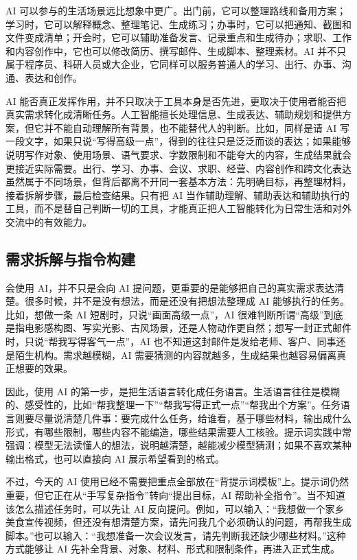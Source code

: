 AI 可以参与的生活场景远比想象中更广。出门前，它可以整理路线和备用方案；学习时，它可以解释概念、整理笔记、生成练习；办事时，它可以把通知、截图和文件变成清单；开会时，它可以辅助准备发言、记录重点和生成待办；求职、工作和内容创作中，它也可以修改简历、撰写邮件、生成脚本、整理素材。AI 并不只属于程序员、科研人员或大企业，它同样可以服务普通人的学习、出行、办事、沟通、表达和创作。

AI 能否真正发挥作用，并不只取决于工具本身是否先进，更取决于使用者能否把真实需求转化成清晰任务。人工智能擅长处理信息、生成表达、辅助规划和提供方案，但它并不能自动理解所有背景，也不能替代人的判断。比如，同样是请 AI 写一段文字，如果只说“写得高级一点”，得到的往往只是泛泛而谈的表达；如果能够说明写作对象、使用场景、语气要求、字数限制和不能夸大的内容，生成结果就会更接近实际需要。出行、学习、办事、会议、求职、经营、内容创作和跨文化表达虽然属于不同场景，但背后都离不开同一套基本方法：先明确目标，再整理材料，接着拆解步骤，最后检查结果。只有把 AI 当作辅助理解、辅助表达和辅助执行的工具，而不是替自己判断一切的工具，才能真正把人工智能转化为日常生活和对外交流中的有效能力。

\subsection{需求拆解与指令构建}

会使用 AI，并不只是会向 AI 提问题，更重要的是能够把自己的真实需求表达清楚。很多时候，并不是没有想法，而是还没有把想法整理成 AI 能够执行的任务。比如，想做一条 AI 短剧时，只说“画面高级一点”，AI 很难判断所谓“高级”到底是指电影感构图、写实光影、古风场景，还是人物动作更自然；想写一封正式邮件时，只说“帮我写得客气一点”，AI 也不知道这封邮件是发给老师、客户、同事还是陌生机构。需求越模糊，AI 需要猜测的内容就越多，生成结果也越容易偏离真正想要的效果。

因此，使用 AI 的第一步，是把生活语言转化成任务语言。生活语言往往是模糊的、感受性的，比如“帮我整理一下”“帮我写得正式一点”“帮我出个方案”。任务语言则要尽量说清楚几件事：要完成什么任务，给谁看，基于哪些材料，输出成什么形式，有哪些限制，哪些内容不能编造，哪些结果需要人工核验。提示词实践中常强调：模型无法读懂人的想法，说明越清楚，越能减少模型猜测；如果不喜欢某种输出格式，也可以直接向 AI 展示希望看到的格式。

不过，今天的 AI 使用已经不需要把重点全部放在“背提示词模板”上。提示词仍然重要，但它正在从“手写复杂指令”转向“提出目标，AI 帮助补全指令”。当不知道该怎么描述任务时，可以先让 AI 反向提问。例如，可以输入：“我想做一个家乡美食宣传视频，但还没有想清楚方案，请先问我几个必须确认的问题，再帮我生成脚本。”也可以输入：“我想准备一次会议发言，请先判断我还缺少哪些材料。”这种方式能够让 AI 先补全背景、对象、材料、形式和限制条件，再进入正式生成。

